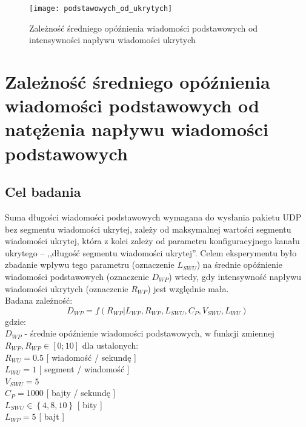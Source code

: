 \documentclass[a4paper, twoside, 12pt]{report}
\begin{document}
        \begin{figure}[h]
                \centering
                \texttt{[image: podstawowych\_od\_ukrytych]}
                \caption{Zależność średniego opóźnienia wiadomości podstawowych od
                    intensywności napływu wiadomości ukrytych}
                \label{OPOZNIENIEPODSTAWOWYCHODUKRYTYCH}
        \end{figure}



    \section{Zależność średniego opóźnienia wiadomości podstawowych od natężenia napływu wiadomości podstawowych} \label{BADANIEDLUGOSCISEGMENTUDANYCHUKRYTYCH}
        \subsection{Cel badania}
            Suma długości wiadomości podstawowych wymagana do wysłania pakietu UDP
            bez segmentu wiadomości ukrytej,
            zależy od maksymalnej wartości segmentu wiadomości ukrytej, która
            z kolei zależy od parametru konfiguracyjnego kanału ukrytego -- ,,długość segmentu wiadomości ukrytej''.
            Celem eksperymentu było zbadanie wpływu tego parametru (oznaczenie \(L_{SWU}\))
            na średnie opóźnienie wiadomości podstawowych (oznaczenie \( D_{WP} \))
            wtedy, gdy intensywność napływu wiadomości ukrytych (oznaczenie \( R_{WP} \)) jest względnie mała.
            \\
            Badana zależność: \\
                $$ D_{WP} = f(R_{WP} | L_{WP}, R_{WP}, L_{SWU}, C_P, V_{SWU}, L_{WU}) $$
            gdzie: \\
                \( D_{WP} \) - średnie opóźnienie wiadomości podstawowych, w funkcji zmiennej \( R_{WP}, R_{WP} \in [0;10] \)
           dla ustalonych: \\
                \( R_{WU} = 0.5 \) [ wiadomość / sekundę ]\\
                \( L_{WU} = 1 \) [ segment / wiadomość ]\\
                \( V_{SWU} = 5 \)\\
                \( C_P = 1000 \) [ bajty / sekundę ]\\
                \( L_{SWU} \in \left\{4, 8, 10\right\}\) [ bity ]\\
                \( L_{WP} = 5 \) [ bajt ]\\
\end{document}
